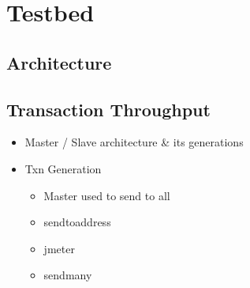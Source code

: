 

\newpage
\section{Testbed} \label{impl-testbed}


\subsection{Architecture} \label{impl-testbed-arch}


\subsection{Transaction Throughput} \label{impl-testbed-arch}



\begin{itemize}
    \item Master / Slave architecture \& its generations

    \item Txn Generation

        \begin{itemize}
            \item Master used to send to all
            \item sendtoaddress
            \item jmeter
            \item sendmany
        \end{itemize}

\end{itemize}
